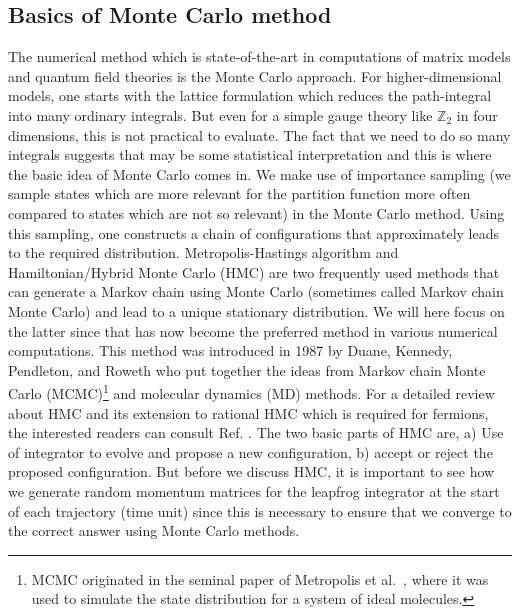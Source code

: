 \documentclass[letter,11pt]{article}
\begin{document}
\subsection{Basics of Monte Carlo method}
The numerical method which is state-of-the-art in computations of matrix models and quantum field theories is the Monte Carlo approach. For higher-dimensional models, one starts with the lattice formulation which reduces the path-integral into many ordinary integrals. But even for a simple
gauge theory like $\mathbb{Z}_{2}$ in four dimensions, this is not practical to evaluate. 
The fact that we need to do so many integrals suggests that may be some statistical 
interpretation and this is where the basic idea of Monte Carlo comes in. We make use of
importance sampling (we sample states which are more relevant for the partition function more often compared to states which are not so relevant) in the Monte Carlo
method. Using this sampling, one constructs a chain of configurations that approximately leads to the required distribution. Metropolis-Hastings algorithm and Hamiltonian/Hybrid Monte Carlo (HMC) 
are two frequently used methods that can generate a Markov chain using Monte Carlo (sometimes called Markov chain Monte Carlo) and lead to a unique stationary distribution. We will here focus on the latter since that has now become the preferred method in various numerical computations. This method was introduced in 1987 by Duane, Kennedy, Pendleton, and Roweth \cite{Duane:1987de} who put together the ideas from Markov chain Monte Carlo (MCMC)\footnote{MCMC originated in the seminal paper of Metropolis et al.~\cite{Metropolis:1953am}, where it was used to simulate the state distribution for a system of ideal molecules.} 
and molecular dynamics (MD) methods. 
For a detailed review about HMC and its extension to rational 
HMC which is required for fermions, the interested readers 
can consult Ref. \cite{Hanada:2018fnp, Joseph:2019zer}.
The two basic parts of HMC are, a) Use of integrator to evolve and propose a new configuration, b) accept or reject the proposed configuration. But before we discuss HMC, 
it is important to see how we generate random momentum 
matrices for the leapfrog integrator 
at the start of each trajectory (time unit) since 
this is necessary to ensure that we converge to the 
correct answer using Monte Carlo methods. 
\end{document}
